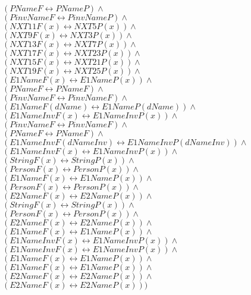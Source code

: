 \documentclass[a4paper,10pt]{article}
\begin{document}
 $ (PNameF \leftrightarrow PNameP) \land $ \\ 
 $ (PinvNameF \leftrightarrow PinvNameP) \land $ \\ 
 $ (NXT11F(x) \leftrightarrow NXT5P(x)) \land $ \\ 
 $ (NXT9F(x) \leftrightarrow NXT3P(x)) \land $ \\ 
 $ (NXT13F(x) \leftrightarrow NXT7P(x)) \land $ \\ 
 $ (NXT17F(x) \leftrightarrow NXT23P(x)) \land $ \\ 
 $ (NXT15F(x) \leftrightarrow NXT21P(x)) \land $ \\ 
 $ (NXT19F(x) \leftrightarrow NXT25P(x)) \land $ \\ 
 $ (E1NameF(x) \leftrightarrow E1NameP(x)) \land $ \\ 
 $ (PNameF \leftrightarrow PNameF) \land $ \\ 
 $ (PinvNameF \leftrightarrow PinvNameF) \land $ \\ 
 $ (E1NameF(dName) \leftrightarrow E1NameP(dName)) \land $ \\ 
 $ (E1NameInvF(x) \leftrightarrow E1NameInvP(x)) \land $ \\ 
 $ (PinvNameF \leftrightarrow PinvNameF) \land $ \\ 
 $ (PNameF \leftrightarrow PNameF) \land $ \\ 
 $ (E1NameInvF(dNameInv) \leftrightarrow E1NameInvP(dNameInv)) \land $ \\ 
 $ (E1NameInvF(x) \leftrightarrow E1NameInvP(x)) \land $ \\ 
 $ (StringF(x) \leftrightarrow StringP(x)) \land $ \\ 
 $ (PersonF(x) \leftrightarrow PersonP(x)) \land $ \\ 
 $ (E1NameF(x) \leftrightarrow E1NameP(x)) \land $ \\ 
 $ (PersonF(x) \leftrightarrow PersonP(x)) \land $ \\ 
 $ (E2NameF(x) \leftrightarrow E2NameP(x)) \land $ \\ 
 $ (StringF(x) \leftrightarrow StringP(x)) \land $ \\ 
 $ (PersonF(x) \leftrightarrow PersonP(x)) \land $ \\ 
 $ (E2NameF(x) \leftrightarrow E2NameP(x)) \land $ \\ 
 $ (E1NameF(x) \leftrightarrow E1NameP(x)) \land $ \\ 
 $ (E1NameInvF(x) \leftrightarrow E1NameInvP(x)) \land $ \\ 
 $ (E1NameInvF(x) \leftrightarrow E1NameInvP(x)) \land $ \\ 
 $ (E1NameF(x) \leftrightarrow E1NameP(x)) \land $ \\ 
 $ (E1NameF(x) \leftrightarrow E1NameP(x)) \land $ \\ 
 $ (E2NameF(x) \leftrightarrow E2NameP(x)) \land $ \\ 
 $ (E2NameF(x) \leftrightarrow E2NameP(x)))$ 
\end{document}
